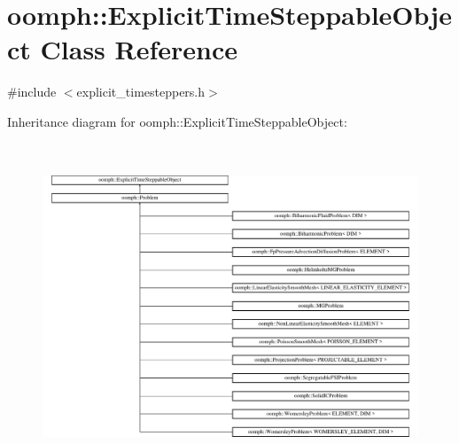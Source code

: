 \hypertarget{classoomph_1_1ExplicitTimeSteppableObject}{}\section{oomph\+:\+:Explicit\+Time\+Steppable\+Object Class Reference}
\label{classoomph_1_1ExplicitTimeSteppableObject}


{\ttfamily \#include $<$explicit\+\_\+timesteppers.\+h$>$}

Inheritance diagram for oomph\+:\+:Explicit\+Time\+Steppable\+Object\+:\begin{figure}[H]
\begin{center}
\leavevmode
\includegraphics[height=9.744780cm]{classoomph_1_1ExplicitTimeSteppableObject}
\end{center}
\end{figure}
